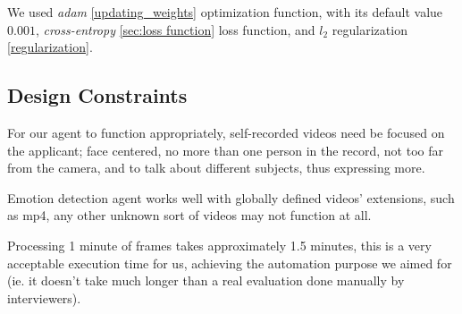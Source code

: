 We used \textit{adam} \ref{updating_weights} optimization function, with its default value $0.001$, \textit{cross-entropy} \ref{sec:loss function} loss function, and \textit{$l_2$} regularization \ref{regularization}.




\subsection{Design Constraints}
For our agent to function appropriately, self-recorded videos need be focused on the applicant; face centered, no more than one person in the record, not too far from the camera, and to talk about different subjects, thus expressing more.

Emotion detection agent works well with globally defined videos' extensions, such as mp4, any other unknown sort of videos may not function at all.

Processing 1 minute of frames takes approximately 1.5 minutes, this is a very acceptable execution time for us, achieving the automation purpose we aimed for (ie. it doesn't take much longer than a real evaluation done manually by interviewers).

